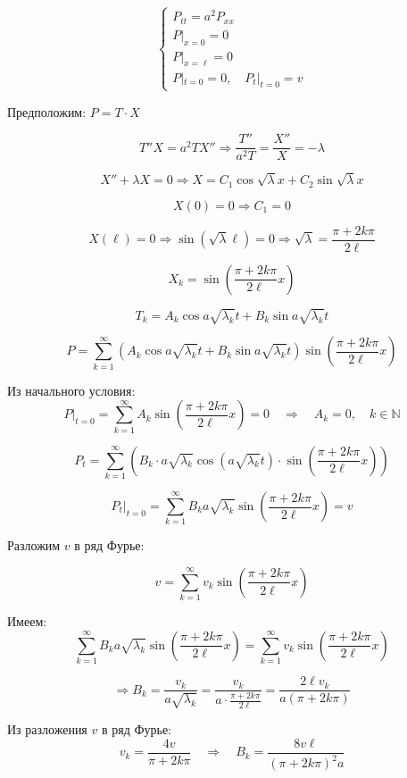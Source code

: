 \documentclass[a4paper,12pt]{article}
\begin{document}
\[
\begin{cases}
P_{tt} = a^2 P_{xx} \\
P|_{x=0} = 0 \\
P|_{x=\ell} = 0 \\
P|_{t=0} = 0, \quad P_t|_{t=0} = v
\end{cases}
\]

Предположим: \( P = T \cdot X \)

\[
T'' X = a^2 T X''
\Rightarrow
\frac{T''}{a^2 T} = \frac{X''}{X} = -\lambda
\]

\[
X'' + \lambda X = 0 \Rightarrow X = C_1 \cos \sqrt{\lambda} x + C_2 \sin \sqrt{\lambda} x
\]

\[
X(0) = 0 \Rightarrow C_1 = 0
\]

\[
X(\ell) = 0 \Rightarrow \sin(\sqrt{\lambda} \ell) = 0 \Rightarrow 
\sqrt{\lambda} = \frac{\pi + 2k\pi}{2\ell}
\]

\[
\boxed{
X_k = \sin\left( \frac{\pi + 2k\pi}{2\ell} x \right)
}
\]

\[
T_k = A_k \cos a \sqrt{\lambda_k} t + B_k \sin a \sqrt{\lambda_k} t
\]

\[
P = \sum_{k=1}^{\infty} \left( A_k \cos a \sqrt{\lambda_k} t + B_k \sin a \sqrt{\lambda_k} t \right) \sin\left( \frac{\pi + 2k\pi}{2\ell} x \right)
\]

Из начального условия:
\[
P|_{t=0} = \sum_{k=1}^{\infty} A_k \sin\left( \frac{\pi + 2k\pi}{2\ell} x \right) = 0 \quad \Rightarrow \quad A_k = 0,\quad k \in \mathbb{N}
\]

\[
P_t = \sum_{k=1}^{\infty} \left( B_k \cdot a \sqrt{\lambda_k} \cos\left( a \sqrt{\lambda_k} t \right) \cdot \sin\left( \frac{\pi + 2k\pi}{2\ell} x \right) \right)
\]

\[
P_t|_{t=0} = \sum_{k=1}^{\infty} B_k a \sqrt{\lambda_k} \sin\left( \frac{\pi + 2k\pi}{2\ell} x \right) = v
\]

Разложим \( v \) в ряд Фурье:

\[
v = \sum_{k=1}^{\infty} v_k \sin\left( \frac{\pi + 2k\pi}{2\ell} x \right)
\]

Имеем:
\[
\sum_{k=1}^{\infty} B_k a \sqrt{\lambda_k} \sin\left( \frac{\pi + 2k\pi}{2\ell} x \right) = \sum_{k=1}^{\infty} v_k \sin\left( \frac{\pi + 2k\pi}{2\ell} x \right)
\]

\[
\Rightarrow B_k = \frac{v_k}{a \sqrt{\lambda_k}} = \frac{v_k}{a \cdot \frac{\pi + 2k\pi}{2\ell}} = \frac{2\ell v_k}{a (\pi + 2k\pi)}
\]

Из разложения $v$ в ряд Фурье:
\[
v_k = \frac{4v}{\pi + 2k\pi}
\quad \Rightarrow \quad
B_k = \frac{8 v \ell}{(\pi + 2k\pi)^2 a}
\]
\end{document}
